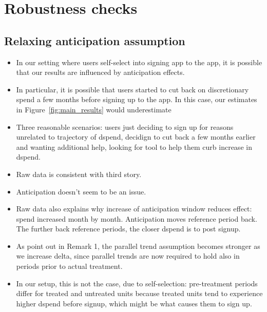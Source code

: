 
\section{Robustness checks}%
\label{sec:robustness_checks}


\subsection{Relaxing anticipation assumption}%
\label{sub:relaxing_anticipation_assumption}

\begin{itemize}
    \item In our setting where users self-select into signing app to the app,
        it is possible that our results are influenced by anticipation effects.

    \item In particular, it is possible that users started to cut back on
        discretionary spend a few months before signing up to the app. In this
    case, our estimates in Figure~\ref{fig:main_results} would underestimate

    \item Three reasonable scenarios: users just deciding to sign up for
        reasons unrelated to trajectory of dspend, decidign to cut back a few
        months earlier and wanting additional help, looking for tool to help
        them curb increase in dspend.

    \item Raw data is consistent with third story.

    \item Anticipation doesn't seem to be an issue.

    \item Raw data also explains why increase of anticipation window reduces
        effect: spend increased month by month. Anticipation moves reference
        period back. The further back reference periods, the closer dspend is
        to post signup.


    \item As \citet{callaway2021difference} point out in Remark 1, the parallel
        trend assumption becomes stronger as we increase delta, since parallel
        trends are now required to hold also in periods prior to actual
        treatment.

    \item In our setup, this is not the case, due to self-selection:
        pre-treatment periods differ for treated and untreated units because
        treated units tend to experience higher dspend before signup, which
        might be what causes them to sign up.

\end{itemize}

